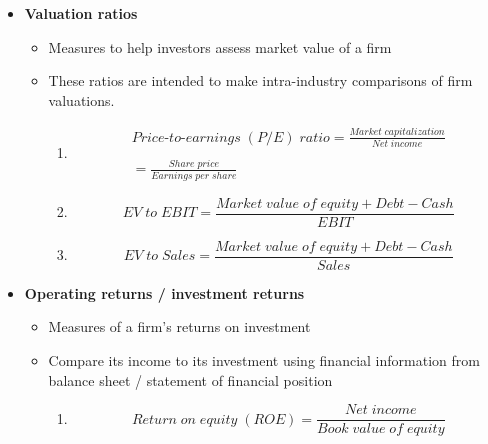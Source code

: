 \documentclass[ieeetran]{article}
\begin{document}
\begin{itemize}
\item \textbf{Valuation ratios}
	\begin{itemize}
	  \item Measures to help investors assess market value of a firm
	  \item These ratios are intended to make intra-industry comparisons of firm valuations.
	  \begin{enumerate}
	    \item
	    \large
	    \begin{equation*}
		    \boxed{
			\begin{aligned}
		    Price\text{-}to\text{-}earnings \; (P/E) \; ratio = \frac{Market \; capitalization}{Net \; income}\\
		    \\
		    = \frac{Share \; price}{Earnings \; per \; share}
			\end{aligned}
	    }
	    \end{equation*}
	    \normalsize

	    			\item
	    			\large
	    			\begin{equation*}
					\boxed{EV \; to \; EBIT = \frac{Market \; value \; of \; equity + Debt - Cash}{EBIT}}
	   			\end{equation*}
	    			\normalsize

	    			\item
	    			\large
	    			\begin{equation*}
					\boxed{EV \; to \; Sales = \frac{Market \; value \; of \; equity + Debt - Cash}{Sales}}
	   			\end{equation*}
	    			\normalsize				
	    
	  \end{enumerate}
	\end{itemize}

\item \textbf{Operating returns / investment returns}
	\begin{itemize}
	  \item Measures of a firm's returns on investment
       	  \item Compare its income to its investment using financial information from balance sheet / statement of financial position
		  \begin{enumerate}
		    \item 
		    \large
		    \begin{equation*}
		    \boxed{Return \; on \; equity \; (ROE)=\frac{Net \; income}{Book \; value \; of \; equity}}
		    \end{equation*}
		    \normalsize


\end{enumerate}
\end{itemize}
\end{itemize}
\end{document}
